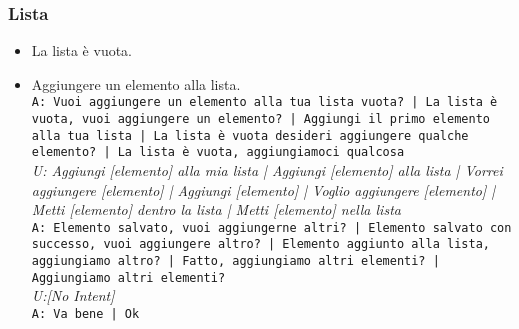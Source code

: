 \subsubsection{Lista}
\begin{itemize}
	\item La lista è vuota.\\
		\item Aggiungere un elemento alla lista.\\
		\texttt{A: Vuoi aggiungere un elemento alla tua lista vuota? | La lista  è vuota, vuoi aggiungere un elemento? | Aggiungi il primo elemento alla tua lista | La lista è vuota desideri aggiungere qualche elemento? | La lista è vuota, aggiungiamoci qualcosa }\\
		\textit{U: Aggiungi [elemento] alla mia lista | Aggiungi [elemento] alla lista | Vorrei aggiungere [elemento] | Aggiungi [elemento] | Voglio aggiungere [elemento] | Metti [elemento] dentro la lista | Metti [elemento] nella lista }\\
		\texttt{A: Elemento salvato, vuoi aggiungerne altri? | Elemento salvato con successo, vuoi aggiungere altro? | Elemento aggiunto alla lista, aggiungiamo altro? | Fatto, aggiungiamo altri elementi? | Aggiungiamo altri elementi? }\\
		\textit{U:[No Intent]}\\
		\texttt{A: Va bene | Ok }\\ 
		

\end{itemize}
